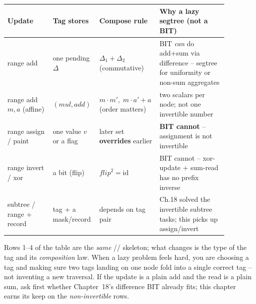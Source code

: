 \begin{center}
\small
\renewcommand{\arraystretch}{1.25}
\begin{tabular}{@{}p{0.20\linewidth} p{0.20\linewidth} p{0.18\linewidth} p{0.30\linewidth}@{}}
\toprule
\textbf{Update} & \textbf{Tag stores} & \textbf{Compose rule} & \textbf{Why a lazy segtree (not a BIT)} \\
\midrule
range add & one pending \(\Delta\) & \(\Delta_1{+}\Delta_2\) (commutative) & BIT \emph{can} do add+sum via difference -- segtree for uniformity or non-sum aggregates \\
range add \(m,a\) (affine) & \((\mathit{mul},\mathit{add})\) & \(m{\cdot}m',\;m{\cdot}a'{+}a\) (order matters) & two scalars per node; not one invertible number \\
range assign / paint & one value \(v\) or a flag & later set \textbf{overrides} earlier & \textbf{BIT cannot} -- assignment is not invertible \\
range invert / xor & a bit (flip) & \(\mathit{flip}^2=\mathrm{id}\) & BIT cannot -- xor-update + sum-read has no prefix inverse \\
subtree / range + record & tag + a mask/record & depends on tag pair & Ch.18 solved the invertible subtree tasks; this picks up assign/invert \\
\bottomrule
\end{tabular}
\end{center}

\begin{insightbox}
Rows 1--4 of the table are the \emph{same} //
skeleton; what changes is the type of the tag and its \emph{composition} law.
When a lazy problem feels hard, you are choosing a tag and making sure two tags
landing on one node fold into a single correct tag -- not inventing a new
traversal.  If the update is a plain add and the read is a plain sum, ask first
whether Chapter~18's difference BIT already fits; this chapter earns its keep on
the \emph{non-invertible} rows.
\end{insightbox}


